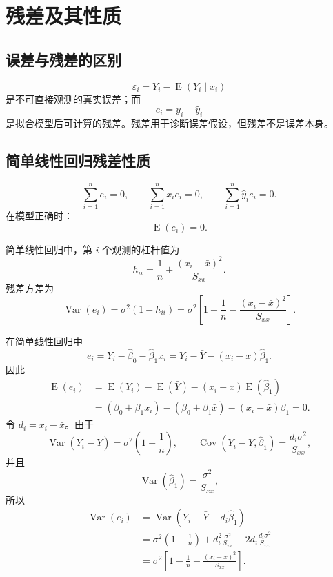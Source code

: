 \documentclass[11pt,a4paper]{article}
\newcommand{\E}{\operatorname{E}}
\newcommand{\Var}{\operatorname{Var}}
\newcommand{\Cov}{\operatorname{Cov}}
\newcommand{\1}{\mathbf{1}}
\begin{document}
\section{残差及其性质}

\subsection{误差与残差的区别}

\[
  \varepsilon_i=Y_i-\E(Y_i\mid x_i)
\]
是不可直接观测的真实误差；而
\[
  e_i=y_i-\hat y_i
\]
是拟合模型后可计算的残差。残差用于诊断误差假设，但残差不是误差本身。

\subsection{简单线性回归残差性质}

\begin{memorybox}
\[
  \boxed{\sum_{i=1}^ne_i=0,}
\qquad
  \boxed{\sum_{i=1}^nx_ie_i=0,}
\qquad
  \boxed{\sum_{i=1}^n\hat y_ie_i=0.}
\]
在模型正确时：
\[
  \boxed{\E(e_i)=0.}
\]
\end{memorybox}

简单线性回归中，第 $i$ 个观测的杠杆值为
\[
  h_{ii}
  =
  \frac1n+\frac{(x_i-\bar x)^2}{S_{xx}}.
\]
残差方差为
\[
  \boxed{
  \Var(e_i)
  =
  \sigma^2(1-h_{ii})
  =
  \sigma^2
  \left[
  1-\frac1n-\frac{(x_i-\bar x)^2}{S_{xx}}
  \right].
  }
\]

\begin{proofbox}
在简单线性回归中
\[
  e_i
  =
  Y_i-\hat\beta_0-\hat\beta_1x_i
  =
  Y_i-\bar Y-(x_i-\bar x)\hat\beta_1.
\]
因此
\[
\begin{aligned}
  \E(e_i)
  &=
  \E(Y_i)-\E(\bar Y)-(x_i-\bar x)\E(\hat\beta_1)\\
  &=
  (\beta_0+\beta_1x_i)-(\beta_0+\beta_1\bar x)
  -(x_i-\bar x)\beta_1
  =
  0.
\end{aligned}
\]
令 $d_i=x_i-\bar x$。由于
\[
  \Var(Y_i-\bar Y)=\sigma^2\left(1-\frac1n\right),
  \qquad
  \Cov(Y_i-\bar Y,\hat\beta_1)=\frac{d_i\sigma^2}{S_{xx}},
\]
并且
\[
  \Var(\hat\beta_1)=\frac{\sigma^2}{S_{xx}},
\]
所以
\[
\begin{aligned}
  \Var(e_i)
  &=
  \Var(Y_i-\bar Y-d_i\hat\beta_1)\\
  &=
  \sigma^2\left(1-\frac1n\right)
  +
  d_i^2\frac{\sigma^2}{S_{xx}}
  -
  2d_i\frac{d_i\sigma^2}{S_{xx}}\\
  &=
  \sigma^2\left[
    1-\frac1n-\frac{(x_i-\bar x)^2}{S_{xx}}
  \right].
\end{aligned}
\]
\end{proofbox}
\end{document}
